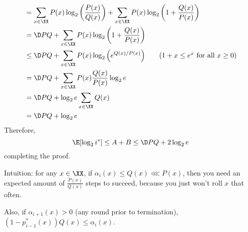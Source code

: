 \documentclass[class=co432,notes,tikz]{agony}
\begin{document}
\begin{prf}
\begin{align*}
      & = \sum_{x\in\XX} P(x) \log_2\qty(\frac{P(x)}{Q(x)}) + \sum_{x\in\XX} P(x) \log_2\qty(1+\frac{Q(x)}{P(x)}) \\
      & = \D P Q + \sum_{x\in\XX} P(x) \log_2\qty(1+\frac{Q(x)}{P(x)})                                            \\
      & \leq \D P Q + \sum_{x\in\XX} P(x) \log_2\qty(e^{Q(x)/P(x)}) \tag{$1+x\leq e^x$ for all $x \geq 0$}        \\
      & = \D P Q + \sum_{x\in\XX} P(x) \frac{Q(x)}{P(x)}\log_2 e                                                  \\
      & = \D P Q + \log_2 e\sum_{x\in\XX} Q(x)                                                                    \\
      & = \D P Q + \log_2 e
  \end{align*}
  Therefore,
  \[ \E[\log_2 i^*] \leq A + B \leq \D P Q + 2\log_2 e \]
  completing the proof.
\end{prf}

Intuition: for any $x\in\XX$, if $\alpha_i(x)\leq Q(x) \lll P(x)$,
then you need an expected amount of $\frac{P(x)}{Q(x)}$ steps to succeed,
because you just won't roll $x$ that often.

Also, if $\alpha_{i+1}(x)>0$ (any round prior to termination),
$(1-p_{i-1}^*(x))Q(x) \leq \alpha_i(x)$.
\end{document}
